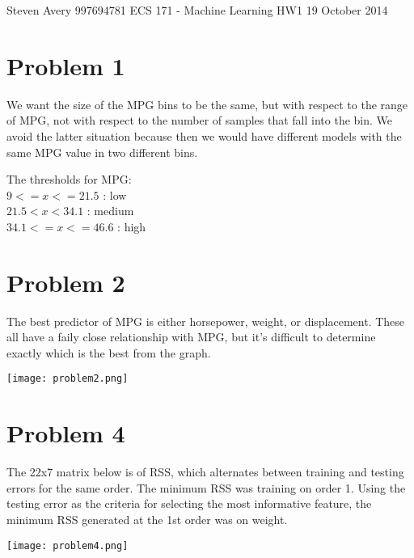 \documentclass{article}
\begin{document}
Steven Avery
997694781
ECS 171 - Machine Learning
HW1
19 October 2014

\section*{Problem 1}
We want the size of the MPG bins to be the same, but with respect to the range of MPG, not with respect to the number of samples that fall into the bin. We avoid the latter situation because then we would have different models with the same MPG value in two different bins.

The thresholds for MPG:\\
$9 <= x <= 21.5$ : low\\
$21.5 < x < 34.1$ : medium\\
$34.1 <= x <= 46.6$ : high

\section*{Problem 2}
The best predictor of MPG is either horsepower, weight, or displacement. These all have a faily close relationship with MPG, but it's difficult to determine exactly which is the best from the graph.

\begin{center}
\texttt{[image: problem2.png]}
\end{center}

\section*{Problem 4}

The 22x7 matrix below is of RSS, which alternates between training and testing errors for the same order. The minimum RSS was training on order 1.
Using the testing error as the criteria for selecting the most informative feature, the minimum RSS generated at the 1st order was on weight.

\begin{center}
\texttt{[image: problem4.png]}
\end{center}
\end{document}
